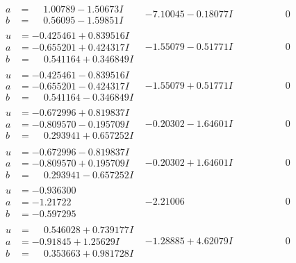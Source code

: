\documentclass[1p]{elsarticle_modified}
\theoremstyle{definition}
\begin{document}
$$\begin{array}{c|c|c}
\begin{aligned}
a &= \phantom{-}1.00789 - 1.50673 I \\
b &= \phantom{-}0.56095 - 1.59851 I\end{aligned}
 & -7.10045 - 0.18077 I & \phantom{-0.000000 } 0 \\ \hline\begin{aligned}
u &= -0.425461 + 0.839516 I \\
a &= -0.655201 + 0.424317 I \\
b &= \phantom{-}0.541164 + 0.346849 I\end{aligned}
 & -1.55079 - 0.51771 I & \phantom{-0.000000 } 0 \\ \hline\begin{aligned}
u &= -0.425461 - 0.839516 I \\
a &= -0.655201 - 0.424317 I \\
b &= \phantom{-}0.541164 - 0.346849 I\end{aligned}
 & -1.55079 + 0.51771 I & \phantom{-0.000000 } 0 \\ \hline\begin{aligned}
u &= -0.672996 + 0.819837 I \\
a &= -0.809570 - 0.195709 I \\
b &= \phantom{-}0.293941 + 0.657252 I\end{aligned}
 & -0.20302 - 1.64601 I & \phantom{-0.000000 } 0 \\ \hline\begin{aligned}
u &= -0.672996 - 0.819837 I \\
a &= -0.809570 + 0.195709 I \\
b &= \phantom{-}0.293941 - 0.657252 I\end{aligned}
 & -0.20302 + 1.64601 I & \phantom{-0.000000 } 0 \\ \hline\begin{aligned}
u &= -0.936300\phantom{ +0.000000I} \\
a &= -1.21722\phantom{ +0.000000I} \\
b &= -0.597295\phantom{ +0.000000I}\end{aligned}
 & -2.21006\phantom{ +0.000000I} & \phantom{-0.000000 } 0 \\ \hline\begin{aligned}
u &= \phantom{-}0.546028 + 0.739177 I \\
a &= -0.91845 + 1.25629 I \\
b &= \phantom{-}0.353663 + 0.981728 I\end{aligned}
 & -1.28885 + 4.62079 I & \phantom{-0.000000 } 0 \\ \hline\begin{aligned}

\end{aligned}
\end{array}$$
\end{document}
